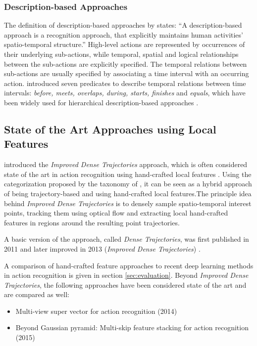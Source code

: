 \subsubsection{Description-based Approaches}
The definition of description-based approaches by \textcite{aggarwal_human_2011} states: ``A description-based approach is a recognition approach, that explicitly maintains human activities' spatio-temporal structure.''
High-level actions are represented by occurrences of their underlying sub-actions, while temporal, spatial and logical relationships between the sub-actions are explicitly specified.
The temporal relations between sub-actions are usually specified by associating a time interval with an occurring action.
\textcite{allen_maintaining_1983}\cite{allen_actions_1994} introduced seven predicates to describe temporal relations between time intervals: \textit{before, meets, overlaps, during, starts, finishes} and \textit{equals}, which have been widely used for hierarchical description-based approaches \cite{pinhanez_human_1998}\cite{siskind_grounding_2001}\cite{nevatia_hierarchical_2003}\cite{ryoo_recognition_2006}.


\subsection{State of the Art Approaches using Local Features}
\label{subsec:conventionalsota}

\textcite{wang_action_2013} introduced the \textit{Improved Dense Trajectories} approach, which is often considered state of the art in action recognition using hand-crafted local features \cite{tran_learning_2015}\cite{wang_towards_2015}\cite{simonyan_two-stream_2014}.
Using the categorization proposed by the taxonomy of \textcite{aggarwal_human_2011}, it can be seen as a hybrid approach of being trajectory-based and using hand-crafted local features.The principle idea behind \textit{Improved Dense Trajectories} is to densely sample spatio-temporal interest points, tracking them using optical flow and extracting local hand-crafted features in regions around the resulting point trajectories.

A basic version of the approach, called \textit{Dense Trajectories}, was first published in 2011 \cite{wang_action_2011} and later improved in 2013 (\textit{Improved Dense Trajectories}) \cite{wang_action_2013}.

A comparison of hand-crafted feature approaches to recent deep learning methods in action recognition is given in section \ref{sec:evaluation}.
Beyond \textit{Improved Dense Trajectories}, the following approaches have been considered state of the art \cite{wang_towards_2015}\cite{lan_beyond_2015}and are compared as well:
\begin{itemize}
    \item Multi-view super vector for action recognition (2014) \cite{cai_multi-view_2014}
    \item Beyond Gaussian pyramid: Multi-skip feature stacking for action recognition (2015) \cite{lan_beyond_2015}
\end{itemize}

